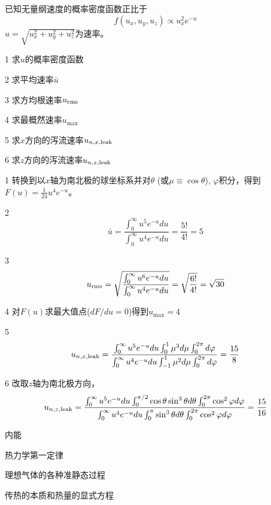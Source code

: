 \documentclass[CJK]{beamer}
\begin{document}
\begin{frame}
\bch
{ 已知无量纲速度的概率密度函数正比于
$$f(u_x,u_y,u_z) \propto u_x^2 e^{-u}$$
$u = \sqrt{u_x^2+u_y^2+u_z^2}$为速率。
\bitem
\item[1]{求$u$的概率密度函数}
\item[2]{求平均速率$\bar{u}$}
\item[3]{求方均根速率$u_{\rm rms}$}
\item[4]{求最概然速率$u_{\max}$}
\item[5]{求$x$方向的泻流速率$u_{n, x, \rm leak}$}
\item[6]{求$z$方向的泻流速率$u_{n, z, \rm leak}$}
\eitem
}
\ech
\end{frame}


\begin{frame}
\bch
{\scriptsize
\bitem
\item[1]{转换到以$x$轴为南北极的球坐标系并对$\theta$ (或$\mu\equiv \cos\theta$), $\varphi$积分，得到$F(u) = \frac{1}{24} u^4 e^{-u}$。}
\item[2]{$$\bar{u} = \frac{\int_0^\infty u^5 e^{-u} du}{\int_0^\infty u^4 e^{-u} du} = \frac{5!}{4!} = 5$$}
\item[3]{$$ u_{\rm rms} = \sqrt{\frac{\int_0^\infty u^6 e^{-u} du}{\int_0^\infty u^4 e^{-u} du}} = \sqrt{\frac{6!}{4!}} = \sqrt{30}$$}
\item[4]{对$F(u)$求最大值点($dF/du = 0$)得到$u_{\max} = 4$}
\item[5]{$$u_{n, x, \rm leak} = \frac{\int_0^\infty u^5e^{-u}du \int_0^1\mu^3 d\mu \int_0^{2\pi} d\varphi}{\int_0^\infty u^4e^{-u}du \int_{-1}^1\mu^2 d\mu \int_0^{2\pi} d\varphi} = \frac{15}{8} $$}
\item[6]{改取$z$轴为南北极方向，
$$u_{n, z, \rm leak} = \frac{\int_0^\infty u^5e^{-u}du \int_0^{\pi/2} \cos\theta \sin^3\theta d\theta \int_0^{2\pi} \cos^2\varphi d\varphi}{\int_0^\infty u^4e^{-u}du \int_{0}^{\pi} \sin^3\theta d\theta \int_0^{2\pi} \cos^2\varphi d\varphi} = \frac{15}{16}$$}
\eitem
}
\ech
\end{frame}


\begin{frame}
\bch
\bitem
\item{内能}
\item{热力学第一定律}
\item{理想气体的各种准静态过程}
\item{传热的本质和热量的显式方程}
\eitem
\ech
\end{frame}
\end{document}
